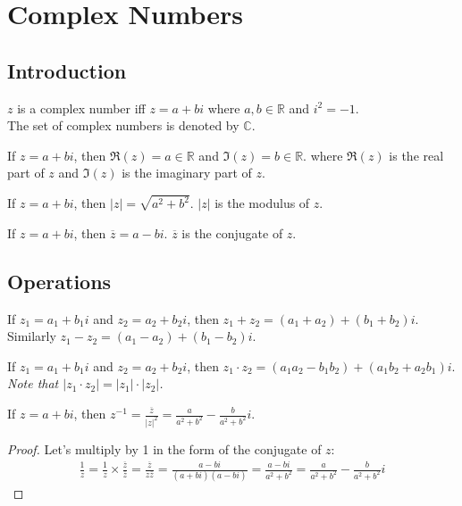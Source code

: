 \chapter{Complex Numbers}
\section{Introduction}
\begin{definition}
    $z$ is a complex number iff $z = a + bi$ where $a, b \in \mathbb{R}$ and $i^2 = -1$. \\
    The set of complex numbers is denoted by $\mathbb{C}$.
\end{definition}
\begin{definition}
    If $z = a + bi$, then $\Re(z) = a \in \mathbb{R}$ and $\Im(z) = b \in \mathbb{R}$. where $\Re(z)$ is the real part of $z$ and $\Im(z)$ is the imaginary part of $z$.
\end{definition}

\begin{definition}
    [Modulus]
    If $z = a + bi$, then $|z| = \sqrt{a^2 + b^2}$. $|z|$ is the modulus of $z$.
\end{definition}

\begin{definition}
    [Conjugate]
    If $z = a + bi$, then $\overline{z} = a - bi$. $\overline{z}$ is the conjugate of $z$.
\end{definition}
\section{Operations}
\begin{definition}
    If $z_1 = a_1 + b_1i$ and $z_2 = a_2 + b_2i$, then $z_1 + z_2 = (a_1 + a_2) + (b_1 + b_2)i$. \\
    Similarly $z_1 - z_2 = (a_1 - a_2) + (b_1 - b_2)i$.
\end{definition}

\begin{definition}
    [Multiplication]
    If $z_1 = a_1 + b_1i$ and $z_2 = a_2 + b_2i$, then $z_1 \cdot z_2 = (a_1a_2 - b_1b_2) + (a_1b_2 + a_2b_1)i$. \\
    \textit{    Note that $|z_1 \cdot z_2| = |z_1| \cdot |z_2|$.}
\end{definition}

\begin{definition}
    [Inversion]
    If $z = a + bi$, then $z^{-1} = \frac{\overline{z}}{|z|^2}= \frac{a}{a^2 + b^2} - \frac{b}{a^2 + b^2}i$.
\end{definition}
\begin{proof}
    Let's multiply by 1 in the form of the conjugate of $z$:
    \begin{align*}
        \frac{1}{z} = \frac{1}{z}\times \frac{\overline{z}}{\overline{z}} = \frac{\overline{z}}{z\overline{z}} = \frac{a - bi}{(a + bi)(a - bi)} = \frac{a - bi}{a^2 + b^2} = \frac{a}{a^2 + b^2} - \frac{b}{a^2 + b^2}i
    \end{align*}
\end{proof}

